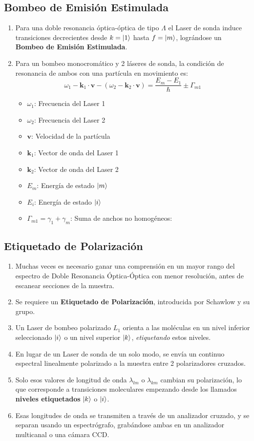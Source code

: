\documentclass[aps,rmp,reprint,longbibliography]{revtex4-1}
\begin{document}
\subsection{Bombeo de Emisión Estimulada}
\begin{enumerate}
\item Para una doble resonancia óptica-óptica de tipo $\Lambda$ el Laser de sonda induce transiciones decrecientes desde $k=\ket{1}$ hasta $f=\ket{m}$, lográndose un \textbf{Bombeo de Emisión Estimulada}.
\item Para un bombeo monocromático y 2 láseres de sonda, la condición de resonancia de ambos con una partícula en movimiento es:
\begin{equation}\label{eq53}\omega_1-\textbf{k}_1\cdot\textbf{v}-(\omega_2-\textbf{k}_2\cdot\textbf{v})=\frac{E_m-E_1}{\hslash}\pm\Gamma_{m1}\end{equation}
\begin{itemize}
    \item $\omega_1$: Frecuencia del Laser 1
    \item $\omega_2$: Frecuencia del Laser 2
    \item $\textbf{v}$: Velocidad de la partícula
    \item $\textbf{k}_1$: Vector de onda del Laser 1
    \item $\textbf{k}_2$: Vector de onda del Laser 2
    \item $E_m$: Energía de estado $\ket{m}$
    \item $E_i$: Energía de estado $\ket{i}$
    \item $\Gamma_{m1}=\gamma_1+\gamma_m$: Suma de anchos no homogéneos: 
\end{itemize}
\end{enumerate}
\subsection{Etiquetado de Polarización}
\begin{enumerate}
\item Muchas veces es necesario ganar una comprensión en un mayor rango del espectro de Doble Resonancia Óptica-Óptica con menor resolución, antes de escanear secciones de la muestra. 
\item Se requiere un \textbf{Etiquetado de Polarización}, introducida por Schawlow y su grupo. 
\item Un Laser de bombeo polarizado $L_1$ orienta a las moléculas en un nivel inferior seleccionado $\ket{i}$ o un nivel superior $\ket{k}$, \textit{etiquetando} estos niveles. 
\item En lugar de un Laser de sonda de un solo modo, se envía un continuo espectral linealmente polarizado a la muestra entre 2 polarizadores cruzados.
\item Solo esos valores de longitud de onda $\lambda_{lm}$ o $\lambda_{km}$ cambian su polarización, lo que corresponde a transiciones moleculares empezando desde los llamados \textbf{niveles etiquetados} $\ket{k}$ o $\ket{i}$.
\item Esas longitudes de onda se transmiten a través de un analizador cruzado, y se separan usando un espectrógrafo, grabándose ambas en un analizador multicanal o una cámara CCD. 
\end{enumerate}
\end{document}
